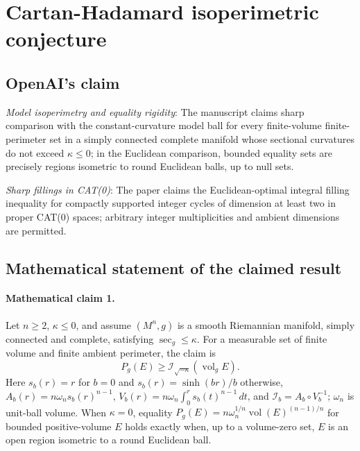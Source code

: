 \documentclass[11pt]{article}
\begin{document}
\section*{Cartan-Hadamard isoperimetric conjecture}

\subsection{OpenAI's claim}
\textit{Model isoperimetry and equality rigidity}: The manuscript claims sharp comparison with the constant-curvature model ball for every finite-volume finite-perimeter set in a simply connected complete manifold whose sectional curvatures do not exceed $\kappa\le0$; in the Euclidean comparison, bounded equality sets are precisely regions isometric to round Euclidean balls, up to null sets.

\textit{Sharp fillings in CAT(0)}: The paper claims the Euclidean-optimal integral filling inequality for compactly supported integer cycles of dimension at least two in proper CAT(0) spaces; arbitrary integer multiplicities and ambient dimensions are permitted.

\subsection{Mathematical statement of the claimed result}
\paragraph{Mathematical claim 1.} Let $n\ge2$, $\kappa\le0$, and assume $(M^n,g)$ is a smooth Riemannian manifold, simply connected and complete, satisfying $\sec_g\le\kappa$. For a measurable set of finite volume and finite ambient perimeter, the claim is \[P_g(E)\ge\mathcal I_{\sqrt{-\kappa}}(\operatorname{vol}_g E).\] Here $s_b(r)=r$ for $b=0$ and $s_b(r)=\sinh(br)/b$ otherwise, $A_b(r)=n\omega_ns_b(r)^{n-1}$, $V_b(r)=n\omega_n\int_0^rs_b(t)^{n-1}\,dt$, and $\mathcal I_b=A_b\circ V_b^{-1}$; $\omega_n$ is unit-ball volume. When $\kappa=0$, equality $P_g(E)=n\omega_n^{1/n}\operatorname{vol}(E)^{(n-1)/n}$ for bounded positive-volume $E$ holds exactly when, up to a volume-zero set, $E$ is an open region isometric to a round Euclidean ball.
\end{document}
